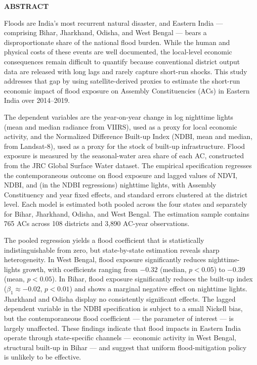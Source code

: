 \documentclass[12pt,a4paper,oneside]{report}
\newcommand{\frontchapter}[1]{%
  \clearpage
  \begin{center}\Large\bfseries\MakeUppercase{#1}\end{center}
  \vspace{1em}
  \addcontentsline{toc}{chapter}{\texorpdfstring{\MakeUppercase{#1}}{#1}}
}
\begin{document}
\frontchapter{Abstract}

Floods are India's most recurrent natural disaster, and Eastern India --- comprising Bihar, Jharkhand, Odisha, and West Bengal --- bears a disproportionate share of the national flood burden. While the human and physical costs of these events are well documented, the local-level economic consequences remain difficult to quantify because conventional district output data are released with long lags and rarely capture short-run shocks. This study addresses that gap by using satellite-derived proxies to estimate the short-run economic impact of flood exposure on Assembly Constituencies (ACs) in Eastern India over 2014--2019.

The dependent variables are the year-on-year change in log nighttime lights (mean and median radiance from VIIRS), used as a proxy for local economic activity, and the Normalized Difference Built-up Index (NDBI, mean and median, from Landsat-8), used as a proxy for the stock of built-up infrastructure. Flood exposure is measured by the seasonal-water area share of each AC, constructed from the JRC Global Surface Water dataset. The empirical specification regresses the contemporaneous outcome on flood exposure and lagged values of NDVI, NDBI, and (in the NDBI regressions) nighttime lights, with Assembly Constituency and year fixed effects, and standard errors clustered at the district level. Each model is estimated both pooled across the four states and separately for Bihar, Jharkhand, Odisha, and West Bengal. The estimation sample contains 765 ACs across 108 districts and 3{,}890 AC-year observations.

The pooled regression yields a flood coefficient that is statistically indistinguishable from zero, but state-by-state estimation reveals sharp heterogeneity. In West Bengal, flood exposure significantly reduces nighttime-lights growth, with coefficients ranging from $-0.32$ (median, $p<0.05$) to $-0.39$ (mean, $p<0.05$). In Bihar, flood exposure significantly reduces the built-up index ($\beta_1 \approx -0.02$, $p<0.01$) and shows a marginal negative effect on nighttime lights. Jharkhand and Odisha display no consistently significant effects. The lagged dependent variable in the NDBI specification is subject to a small Nickell bias, but the contemporaneous flood coefficient --- the parameter of interest --- is largely unaffected. These findings indicate that flood impacts in Eastern India operate through state-specific channels --- economic activity in West Bengal, structural built-up in Bihar --- and suggest that uniform flood-mitigation policy is unlikely to be effective.
\end{document}
